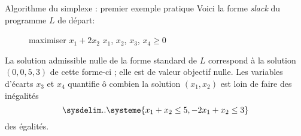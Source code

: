 \documentclass[aspectratio = 169]{beamer}
\begin{document}
\begin{frame}{Algorithme du simplexe : premier exemple pratique}
  Voici la forme \textit{slack} du programme $L$ de départ:
    \begin{figure}
      \begin{linearProg}{
          maximiser
        }{
          $x_1 + 2x_2$
        }{
        }{
          $x_1$, $x_2$, $x_3$, $x_4 \geq 0$
        }
      \end{linearProg}
    \end{figure}
    La solution admissible nulle de la forme standard de $L$
    correspond à la solution $(0, 0, 5, 3)$ de cette forme-ci ; elle
    est de valeur objectif nulle. Les variables d'écarts $x_3$ et
    $x_4$ quantifie ô combien la solution $(x_1, x_2)$ est loin de
    faire des inégalités
    \[
    \sysdelim..{\systeme{x_1 + x_2 \leq 5, -2x_1 + x_2 \leq 3}}
    \]
    des égalités.
\end{frame}
\end{document}
